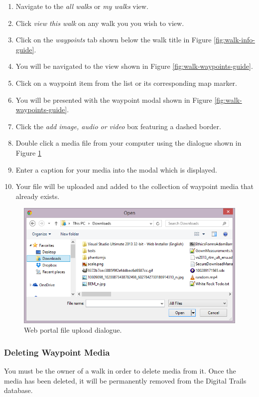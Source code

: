 \documentclass[11pt,a4paper]{report}
\begin{document}
\begin{enumerate}
\item Navigate to the \emph{all walks} or \emph{my walks} view.
\item Click \emph{view this walk} on any walk you you wish to view.
\item Click on the \emph{waypoints} tab shown below the walk title in Figure \ref{fig:walk-info-guide}.
\item You will be navigated to the view shown in Figure \ref{fig:walk-waypoints-guide}.
\item Click on a waypoint item from the list or its corresponding map marker.
\item You will be presented with the waypoint modal shown in Figure \ref{fig:walk-waypoints-guide}.
\item Click the \emph{add image, audio or video} box featuring a dashed border.
\item Double click a media file from your computer using the dialogue shown in Figure \ref{fig:FileUpload}
\item Enter a caption for your media into the modal which is displayed.
\item Your file will be uploaded and added to the collection of waypoint media that already exists.
\end{enumerate}

\begin{figure}[h]
\centering
\includegraphics[width=0.7\linewidth]{./img/webportal-guide/FileUpload}
\caption{Web portal file upload dialogue.}
\label{fig:FileUpload}
\end{figure}

\subsubsection{Deleting Waypoint Media}

You must be the owner of a walk in order to delete media from it. Once the media has been deleted, it will be permanently removed from the Digital Trails database.
\end{document}
